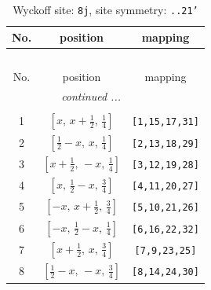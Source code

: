 \documentclass[fleqn,8pt]{jsarticle}
\begin{document}
\begin{longtable}{ccc}
\caption{Wyckoff site: {\tt 8j}, site symmetry: {\tt ..21'}}
 \\
 \hline \hline
No. & position & mapping \\ \hline \endfirsthead

\multicolumn{2}{l}{\tablename\ \thetable{}} \\
 \hline \hline
No. & position & mapping \\ \hline \endhead

 \hline \hline
\multicolumn{2}{r}{\footnotesize\it continued ...} \\ \endfoot

 \hline \hline
\multicolumn{2}{r}{} \\ \endlastfoot

1 & $\left[ x,\, x + \frac{1}{2},\, \frac{1}{4} \right]$ & {\tt [1,15,17,31]} \\ \hline
2 & $\left[ \frac{1}{2} - x,\, x,\, \frac{1}{4} \right]$ & {\tt [2,13,18,29]} \\ \hline
3 & $\left[ x + \frac{1}{2},\, - x,\, \frac{1}{4} \right]$ & {\tt [3,12,19,28]} \\ \hline
4 & $\left[ x,\, \frac{1}{2} - x,\, \frac{3}{4} \right]$ & {\tt [4,11,20,27]} \\ \hline
5 & $\left[ - x,\, x + \frac{1}{2},\, \frac{3}{4} \right]$ & {\tt [5,10,21,26]} \\ \hline
6 & $\left[ - x,\, \frac{1}{2} - x,\, \frac{1}{4} \right]$ & {\tt [6,16,22,32]} \\ \hline
7 & $\left[ x + \frac{1}{2},\, x,\, \frac{3}{4} \right]$ & {\tt [7,9,23,25]} \\ \hline
8 & $\left[ \frac{1}{2} - x,\, - x,\, \frac{3}{4} \right]$ & {\tt [8,14,24,30]} \\
\end{longtable}
\renewcommand{\arraystretch}{1.2}
\end{document}
